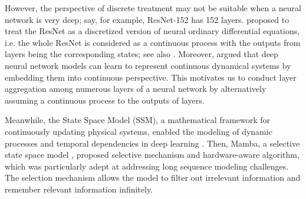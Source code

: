 However, the perspective of discrete treatment may not be suitable when a neural network is very deep; say, for example, ResNet-152 has 152 layers.
\cite{sander2022residualneuralnetworksdiscretize} proposed to treat the ResNet as a discretized version of neural ordinary differential equations, i.e. the whole ResNet is considered as a continuous process with the outputs from layers being the corresponding states; see also \cite{liu2020does}.
Moreover, \citet{queiruga2020continuous} argued that deep neural network models can learn to represent continuous dynamical systems by embedding them into continuous perspective. 
%
This motivates us to conduct layer aggregation among numerous layers of a neural network by alternatively assuming a continuous process to the outputs of layers.
%


Meanwhile, the State Space Model (SSM), a mathematical framework for continuously updating physical systems, enabled the modeling of dynamic processes and temporal dependencies in deep learning \citep{gu2023mamba,liu2024vmamba}. Then, Mamba, a selective state space model \citep{gu2023mamba}, proposed selective mechanism and hardware-aware algorithm, which was particularly adept at addressing long sequence modeling challenges. The selection mechanism allows the model to filter out irrelevant information and remember relevant information infinitely.

%


